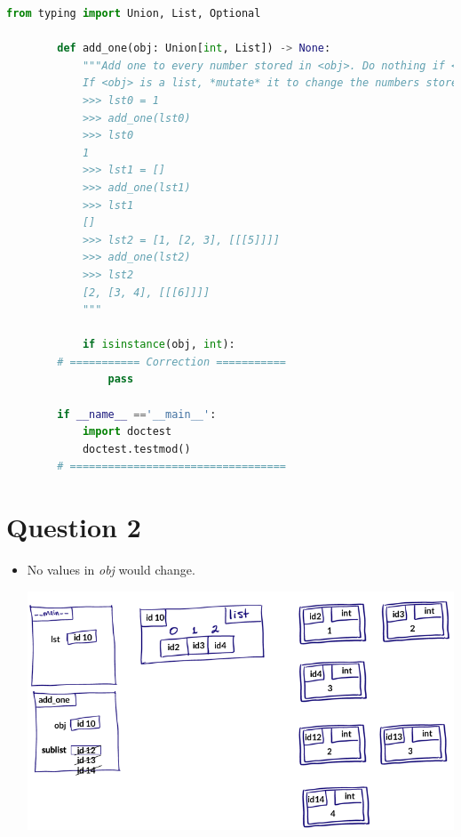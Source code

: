 \documentclass[12pt]{article}
\begin{document}
\begin{itemize}
\begin{mdframed}
        \begin{lstlisting}[language=python,caption={worksheet\_17\_q1\_solution.py}]
        from typing import Union, List, Optional

        def add_one(obj: Union[int, List]) -> None:
            """Add one to every number stored in <obj>. Do nothing if <obj> is an int.
            If <obj> is a list, *mutate* it to change the numbers stored.
            >>> lst0 = 1
            >>> add_one(lst0)
            >>> lst0
            1
            >>> lst1 = []
            >>> add_one(lst1)
            >>> lst1
            []
            >>> lst2 = [1, [2, 3], [[[5]]]]
            >>> add_one(lst2)
            >>> lst2
            [2, [3, 4], [[[6]]]]
            """

            if isinstance(obj, int):
        # =========== Correction ===========
                pass

        if __name__ =='__main__':
            import doctest
            doctest.testmod()
        # ==================================
        \end{lstlisting}
    \end{mdframed}
\end{itemize}

\section*{Question 2}
\begin{itemize}
    \item No values in \textit{obj} would change.

    \begin{center}
    \includegraphics[width=0.8 \linewidth]{images/worksheet_17_q2_solution.png}
    \end{center}
\end{itemize}
\end{document}

